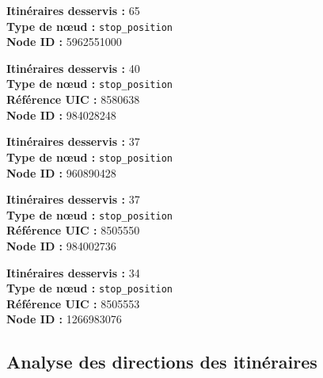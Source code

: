 \begin{tcolorbox}[colback=blue!5, colframe=blue!40, title=\textbf{1er} — Zürich Bus Station, fontupper=\normalsize\bfseries]
\textbf{Itinéraires desservis :} 65 \\
\textbf{Type de nœud :} \texttt{stop\_position} \\
\textbf{Node ID :} 5962551000
\end{tcolorbox}

\begin{tcolorbox}[colback=green!5, colframe=green!40, title=\textbf{2e} — Stein, fontupper=\normalsize\bfseries]
\textbf{Itinéraires desservis :} 40 \\
\textbf{Type de nœud :} \texttt{stop\_position} \\
\textbf{Référence UIC :} 8580638 \\
\textbf{Node ID :} 984028248
\end{tcolorbox}

\begin{tcolorbox}[colback=orange!5, colframe=orange!40, title=\textbf{3e} — Genève - Gare Routière, fontupper=\normalsize\bfseries]
\textbf{Itinéraires desservis :} 37 \\
\textbf{Type de nœud :} \texttt{stop\_position} \\
\textbf{Node ID :} 960890428
\end{tcolorbox}

\begin{tcolorbox}[colback=purple!5, colframe=purple!40, title=\textbf{4e} — Lugano Centrale, fontupper=\normalsize\bfseries]
\textbf{Itinéraires desservis :} 37 \\
\textbf{Type de nœud :} \texttt{stop\_position} \\
\textbf{Référence UIC :} 8505550 \\
\textbf{Node ID :} 984002736
\end{tcolorbox}

\begin{tcolorbox}[colback=red!5, colframe=red!40, title=\textbf{5e} — Paradiso, fontupper=\normalsize\bfseries]
\textbf{Itinéraires desservis :} 34 \\
\textbf{Type de nœud :} \texttt{stop\_position} \\
\textbf{Référence UIC :} 8505553 \\
\textbf{Node ID :} 1266983076
\end{tcolorbox}

\subsection{Analyse des directions des itinéraires}

